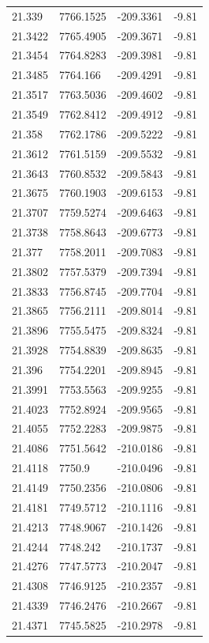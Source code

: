 \begin{table}[H]
\begin{tabular}{llll}
21.339 & 7766.1525 & -209.3361 & -9.81 \\
21.3422 & 7765.4905 & -209.3671 & -9.81 \\
21.3454 & 7764.8283 & -209.3981 & -9.81 \\
21.3485 & 7764.166 & -209.4291 & -9.81 \\
21.3517 & 7763.5036 & -209.4602 & -9.81 \\
21.3549 & 7762.8412 & -209.4912 & -9.81 \\
21.358 & 7762.1786 & -209.5222 & -9.81 \\
21.3612 & 7761.5159 & -209.5532 & -9.81 \\
21.3643 & 7760.8532 & -209.5843 & -9.81 \\
21.3675 & 7760.1903 & -209.6153 & -9.81 \\
21.3707 & 7759.5274 & -209.6463 & -9.81 \\
21.3738 & 7758.8643 & -209.6773 & -9.81 \\
21.377 & 7758.2011 & -209.7083 & -9.81 \\
21.3802 & 7757.5379 & -209.7394 & -9.81 \\
21.3833 & 7756.8745 & -209.7704 & -9.81 \\
21.3865 & 7756.2111 & -209.8014 & -9.81 \\
21.3896 & 7755.5475 & -209.8324 & -9.81 \\
21.3928 & 7754.8839 & -209.8635 & -9.81 \\
21.396 & 7754.2201 & -209.8945 & -9.81 \\
21.3991 & 7753.5563 & -209.9255 & -9.81 \\
21.4023 & 7752.8924 & -209.9565 & -9.81 \\
21.4055 & 7752.2283 & -209.9875 & -9.81 \\
21.4086 & 7751.5642 & -210.0186 & -9.81 \\
21.4118 & 7750.9 & -210.0496 & -9.81 \\
21.4149 & 7750.2356 & -210.0806 & -9.81 \\
21.4181 & 7749.5712 & -210.1116 & -9.81 \\
21.4213 & 7748.9067 & -210.1426 & -9.81 \\
21.4244 & 7748.242 & -210.1737 & -9.81 \\
21.4276 & 7747.5773 & -210.2047 & -9.81 \\
21.4308 & 7746.9125 & -210.2357 & -9.81 \\
21.4339 & 7746.2476 & -210.2667 & -9.81 \\
21.4371 & 7745.5825 & -210.2978 & -9.81 \\

\end{tabular}
\end{table}

